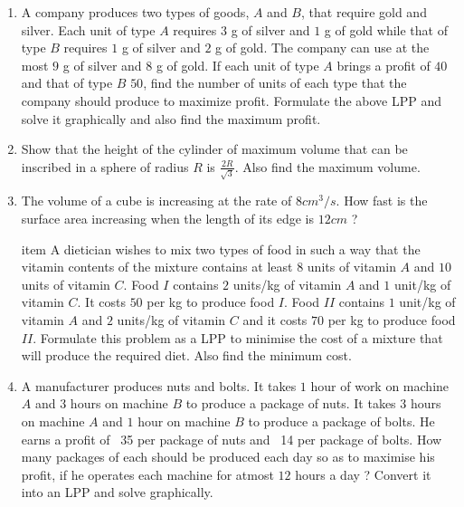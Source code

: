 \begin{enumerate}
\item A company produces two types of goods, $A$ and $B$, that require gold and silver. Each unit of type $A$ requires $3$ g of silver and $1$ g of gold while that of type $B$ requires $1$ g of silver and $2$ g of gold. The company can use at the most $9$ g of silver and $8$ g of gold. If each unit of type $A$ brings a profit of \rupee $40$ and that of type $B$ \rupee $50$, find the number of units of each type that the company should produce to maximize profit. Formulate the above LPP and solve it graphically and also find the maximum profit.

\item Show that the height of the cylinder of maximum volume that can be inscribed in a sphere of radius $R$ is $\frac{2R}{\sqrt{3}}$. Also find the maximum volume.

\item The volume of a cube is increasing at the rate of $8 cm^3/s$. How fast is the surface area increasing when the length of its edge is $12 cm$ ?

item A dietician wishes to mix two types of food in such a way that the vitamin contents of the mixture contains at least $8$ units of vitamin $A$ and $10$ units of vitamin $C $. Food $I $ contains $2$ units/kg of vitamin $A$ and $1$ unit/kg of vitamin $C$. It costs \rupee$50$ per kg to produce food $I$. Food $II$ contains $1$ unit/kg of vitamin $A$ and $2$ units/kg of vitamin $C$ and it costs \rupee $70$ per kg to produce food $II$. Formulate this problem as a LPP to minimise the cost of a mixture that will produce the required diet. Also find the minimum cost.


\item A manufacturer produces nuts and bolts. It takes $1$ hour of work on machine $A$ and $3$ hours on machine $B$ to produce a package of nuts. It takes $3$ hours on machine $A$ and $1$ hour on machine $B$ to produce a package of bolts. He earns a profit of \rupee~35 per package of nuts and \rupee~14 per package of bolts. How many packages of each should be produced each day so as to maximise his profit, if he operates each machine for atmost $12$ hours a day ? Convert it into an LPP and solve graphically.
\end{enumerate}
